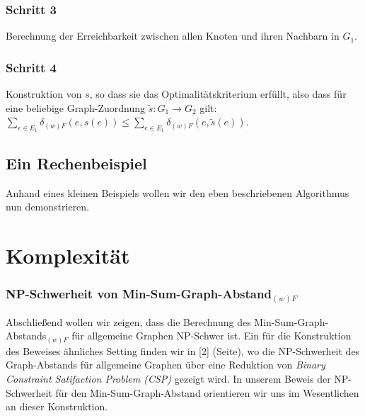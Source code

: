 \documentclass[a4paper, 12pt, twoside]{article}
\theoremstyle{Format1} %
\begin{document}
\subsubsection{Schritt 3}
Berechnung der Erreichbarkeit zwischen allen Knoten und ihren Nachbarn in $G_1$.

\subsubsection{Schritt 4}
Konstruktion von $s$, so dass sie das Optimalitätskriterium erfüllt, also dass für eine beliebige Graph-Zuordnung $\tilde{s}: G_1 \to G_2$ gilt:
$\sum_{e \in E_1}\delta_{(w)F}(e, s(e)) \leq \sum_{e \in E_1}\delta_{(w)F}(e, \tilde{s}(e))$.

\subsection{Ein Rechenbeispiel}
Anhand eines kleinen Beispiels wollen wir den eben beschriebenen Algorithmus nun demonstrieren.

\section{Komplexität}

\subsubsection{NP-Schwerheit von Min-Sum-Graph-Abstand$_{(w)F}$}

Abschließend wollen wir zeigen, dass die Berechnung des Min-Sum-Graph-Abstands$_{(w)F}$ für allgemeine Graphen
NP-Schwer ist. Ein für die Konstruktion des Beweises ähnliches Setting finden wir in [2] (Seite), wo die NP-Schwerheit des Graph-Abstands für allgemeine Graphen
über eine Reduktion von \textit{Binary Constraint Satifaction Problem (CSP)} gezeigt wird.
In unserem Beweis der NP-Schwerheit für den Min-Sum-Graph-Abstand orientieren wir uns im Wesentlichen an dieser Konstruktion.
\end{document}
